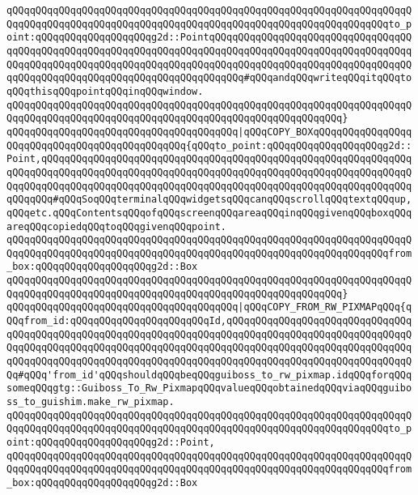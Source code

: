 \verb|qQQqqQQqqQQqqQQqqQQqqQQqqQQqqQQqqQQqqQQqqQQqqQQqqQQqqQQqqQQqqQQqqQQqqQQqqQQqqQQqqQQqqQQqqQQqqQQqqQQqqQQqqQQqqQQqqQQqqQQqqQQqqQQqqQQqqQQqto_point:qQQqqQQqqQQqqQQqqQQqg2d::PointqQQqqQQqqQQqqQQqqQQqqQQqqQQqqQQqqQQqqQQqqQQqqQQqqQQqqQQqqQQqqQQqqQQqqQQqqQQqqQQqqQQqqQQqqQQqqQQqqQQqqQQqqQQqqQQqqQQqqQQqqQQqqQQqqQQqqQQqqQQqqQQqqQQqqQQqqQQqqQQqqQQqqQQqqQQqqQQqqQQqqQQqqQQqqQQqqQQqqQQqqQQqqQQqqQQqqQQq#qQQqandqQQqwriteqQQqitqQQqtoqQQqthisqQQqpointqQQqinqQQqwindow.|\newline
\verb|qQQqqQQqqQQqqQQqqQQqqQQqqQQqqQQqqQQqqQQqqQQqqQQqqQQqqQQqqQQqqQQqqQQqqQQqqQQqqQQqqQQqqQQqqQQqqQQqqQQqqQQqqQQqqQQqqQQqqQQqqQQqqQQq}|\newline
\verb|qQQqqQQqqQQqqQQqqQQqqQQqqQQqqQQqqQQqqQQq|\verb#|qQQqCOPY_BOXqQQqqQQqqQQqqQQqqQQqqQQqqQQqqQQqqQQqqQQqqQQqqQQq{qQQqto_point:qQQqqQQqqQQqqQQqqQQqg2d::Point,qQQqqQQqqQQqqQQqqQQqqQQqqQQqqQQqqQQqqQQqqQQqqQQqqQQqqQQqqQQqqQQqqQQqqQQqqQQqqQQqqQQqqQQqqQQqqQQqqQQqqQQqqQQqqQQqqQQqqQQqqQQqqQQqqQQqqQQqqQQqqQQqqQQqqQQqqQQqqQQqqQQqqQQqqQQqqQQqqQQqqQQqqQQqqQQqqQQqqQQqqQQqqQQqqQQq#\verb|#qQQqSoqQQqterminalqQQqwidgetsqQQqcanqQQqscrollqQQqtextqQQqup,qQQqetc.qQQqContentsqQQqofqQQqscreenqQQqareaqQQqinqQQqgivenqQQqboxqQQqareqQQqcopiedqQQqtoqQQqgivenqQQqpoint.|\newline
\verb|qQQqqQQqqQQqqQQqqQQqqQQqqQQqqQQqqQQqqQQqqQQqqQQqqQQqqQQqqQQqqQQqqQQqqQQqqQQqqQQqqQQqqQQqqQQqqQQqqQQqqQQqqQQqqQQqqQQqqQQqqQQqqQQqqQQqqQQqfrom_box:qQQqqQQqqQQqqQQqqQQqg2d::Box|\newline
\verb|qQQqqQQqqQQqqQQqqQQqqQQqqQQqqQQqqQQqqQQqqQQqqQQqqQQqqQQqqQQqqQQqqQQqqQQqqQQqqQQqqQQqqQQqqQQqqQQqqQQqqQQqqQQqqQQqqQQqqQQqqQQqqQQq}|\newline
\verb|qQQqqQQqqQQqqQQqqQQqqQQqqQQqqQQqqQQqqQQq|\verb#|qQQqCOPY_FROM_RW_PIXMAPqQQq{qQQqfrom_id:qQQqqQQqqQQqqQQqqQQqqQQqId,qQQqqQQqqQQqqQQqqQQqqQQqqQQqqQQqqQQqqQQqqQQqqQQqqQQqqQQqqQQqqQQqqQQqqQQqqQQqqQQqqQQqqQQqqQQqqQQqqQQqqQQqqQQqqQQqqQQqqQQqqQQqqQQqqQQqqQQqqQQqqQQqqQQqqQQqqQQqqQQqqQQqqQQqqQQqqQQqqQQqqQQqqQQqqQQqqQQqqQQqqQQqqQQqqQQqqQQqqQQqqQQqqQQqqQQqqQQqqQQqqQQq#\verb|#qQQq'from_id'qQQqshouldqQQqbeqQQqguiboss_to_rw_pixmap.idqQQqforqQQqsomeqQQqgtg::Guiboss_To_Rw_PixmapqQQqvalueqQQqobtainedqQQqviaqQQqguiboss_to_guishim.make_rw_pixmap.|\newline
\verb|qQQqqQQqqQQqqQQqqQQqqQQqqQQqqQQqqQQqqQQqqQQqqQQqqQQqqQQqqQQqqQQqqQQqqQQqqQQqqQQqqQQqqQQqqQQqqQQqqQQqqQQqqQQqqQQqqQQqqQQqqQQqqQQqqQQqqQQqto_point:qQQqqQQqqQQqqQQqqQQqg2d::Point,|\newline
\verb|qQQqqQQqqQQqqQQqqQQqqQQqqQQqqQQqqQQqqQQqqQQqqQQqqQQqqQQqqQQqqQQqqQQqqQQqqQQqqQQqqQQqqQQqqQQqqQQqqQQqqQQqqQQqqQQqqQQqqQQqqQQqqQQqqQQqqQQqfrom_box:qQQqqQQqqQQqqQQqqQQqg2d::Box|\newline
